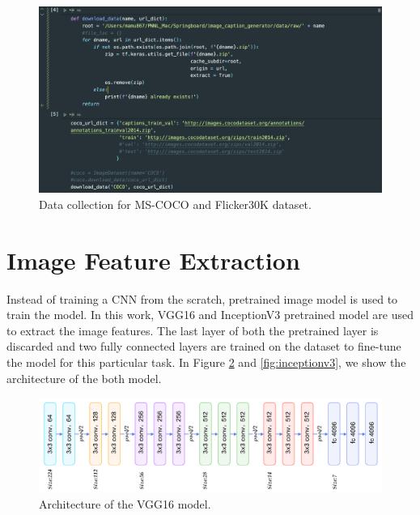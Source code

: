 \documentclass[12pt]{article}
\begin{document}
\begin{figure}[h!]
\begin{center}
\includegraphics[width=7in]{data_collection.png}
\end{center}
\caption{\label{fig:data_collection}
Data collection for MS-COCO and Flicker30K dataset.}
\end{figure}

\section{Image Feature Extraction}
\label{sec:imfeat}

Instead of training a CNN from the scratch, pretrained image model is used to train the model. In this work, VGG16 and InceptionV3 pretrained model are used to extract the image features. The last layer of both the pretrained layer is discarded and two fully connected layers are trained on the dataset to fine-tune the model for this particular task. In Figure \ref{fig:vgg16} and \ref{fig:inceptionv3}, we show the architecture of the both model.

\begin{figure}[h!]
\begin{center}
\includegraphics[width=7in]{vgg16.png}
\end{center}
\caption{\label{fig:vgg16}
Architecture of the VGG16 model.}
\end{figure}
\end{document}
